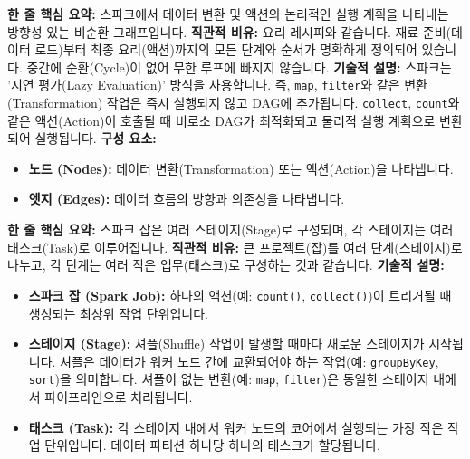 \documentclass[11pt,a4paper]{article}
\begin{document}
\begin{tcolorbox}[title=\textbf{DAG (Directed Acyclic Graph)}, colback=orange!5!white, colframe=orange!75!black, sharp corners, boxrule=0.8pt]
\textbf{한 줄 핵심 요약:} 스파크에서 데이터 변환 및 액션의 논리적인 실행 계획을 나타내는 방향성 있는 비순환 그래프입니다.
\textbf{직관적 비유:} 요리 레시피와 같습니다. 재료 준비(데이터 로드)부터 최종 요리(액션)까지의 모든 단계와 순서가 명확하게 정의되어 있습니다. 중간에 순환(Cycle)이 없어 무한 루프에 빠지지 않습니다.
\textbf{기술적 설명:} 스파크는 '지연 평가(Lazy Evaluation)' 방식을 사용합니다. 즉, \texttt{map}, \texttt{filter}와 같은 변환(Transformation) 작업은 즉시 실행되지 않고 DAG에 추가됩니다. \texttt{collect}, \texttt{count}와 같은 액션(Action)이 호출될 때 비로소 DAG가 최적화되고 물리적 실행 계획으로 변환되어 실행됩니다.
\textbf{구성 요소:}
\begin{itemize}
    \item \textbf{노드 (Nodes):} 데이터 변환(Transformation) 또는 액션(Action)을 나타냅니다.
    \item \textbf{엣지 (Edges):} 데이터 흐름의 방향과 의존성을 나타냅니다.
\end{itemize}
\end{tcolorbox}

\begin{tcolorbox}[title=\textbf{스파크 잡(Job)의 구성}, colback=orange!5!white, colframe=orange!75!black, sharp corners, boxrule=0.8pt]
\textbf{한 줄 핵심 요약:} 스파크 잡은 여러 스테이지(Stage)로 구성되며, 각 스테이지는 여러 태스크(Task)로 이루어집니다.
\textbf{직관적 비유:} 큰 프로젝트(잡)를 여러 단계(스테이지)로 나누고, 각 단계는 여러 작은 업무(태스크)로 구성하는 것과 같습니다.
\textbf{기술적 설명:}
\begin{itemize}
    \item \textbf{스파크 잡 (Spark Job):} 하나의 액션(예: \texttt{count()}, \texttt{collect()})이 트리거될 때 생성되는 최상위 작업 단위입니다.
    \item \textbf{스테이지 (Stage):} 셔플(Shuffle) 작업이 발생할 때마다 새로운 스테이지가 시작됩니다. 셔플은 데이터가 워커 노드 간에 교환되어야 하는 작업(예: \texttt{groupByKey}, \texttt{sort})을 의미합니다. 셔플이 없는 변환(예: \texttt{map}, \texttt{filter})은 동일한 스테이지 내에서 파이프라인으로 처리됩니다.
    \item \textbf{태스크 (Task):} 각 스테이지 내에서 워커 노드의 코어에서 실행되는 가장 작은 작업 단위입니다. 데이터 파티션 하나당 하나의 태스크가 할당됩니다.
\end{itemize}
\end{tcolorbox}
\end{document}
